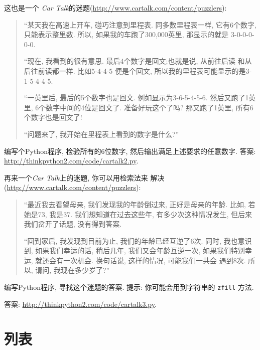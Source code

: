 \documentclass[10pt]{book}
\begin{document}
\begin{exercise}
这也是一个 {\em Car Talk}的迷题(\url{http://www.cartalk.com/content/puzzlers}):

\begin{quote}

``某天我在高速上开车, 碰巧注意到里程表. 
同多数里程表一样, 它有6个数字, 只能表示整里数. 
所以, 如果我的车跑了300,000英里, 那显示的就是
3-0-0-0-0-0.

``现在, 我看到的很有意思. 最后4个数字是回文;也就是说, 从前往后读
和从后往前读都一样. 比如5-4-4-5 便是个回文, 
所以我的里程表可能显示的是3-1-5-4-4-5.

``一英里后, 最后的5个数字也是回文. 
例如显示为3-6-5-4-5-6. 然后又跑了1英里, 6个数字中间的4位是回文了. 
准备好玩这个了吗?  那又跑了1英里, 所有6个数字也是回文了!

``问题来了, 我开始在里程表上看到的数字是什么?''
\end{quote}

编写个Python程序, 检验所有的6位数字, 然后输出满足上述要求的任意数字. 
答案: \url{http://thinkpython2.com/code/cartalk2.py}.

\end{exercise}


\begin{exercise}
再来一个{\em Car Talk}上的迷题, 你可以用检索法来
解决(\url{http://www.cartalk.com/content/puzzlers}):

\begin{quote}
``最近我去看望母亲, 我们发现我的年龄倒过来, 正好是母亲的年龄. 
比如, 若她是73, 我是37. 我们想知道在过去这些年, 有多少次这种情况发生, 
但后来我们岔开了话题, 没有得到答案. 

``回到家后, 我发现到目前为止, 我们的年龄已经互逆了6次. 
同时, 我也意识到, 如果我们幸运的话, 稍后几年, 我们又会年龄互逆一次, 
如果我们特别幸运, 就还会有一次机会. 换句话说, 这样的情况, 可能我们一共会
遇到8次. 所以, 请问, 我现在多少岁了?''

\end{quote}

编写Python程序, 寻找这个迷题的答案. 
提示: 你可能会用到字符串的 {\tt zfill} 方法. 

答案: \url{http://thinkpython2.com/code/cartalk3.py}.

\end{exercise}



\chapter{列表}
\end{document}
